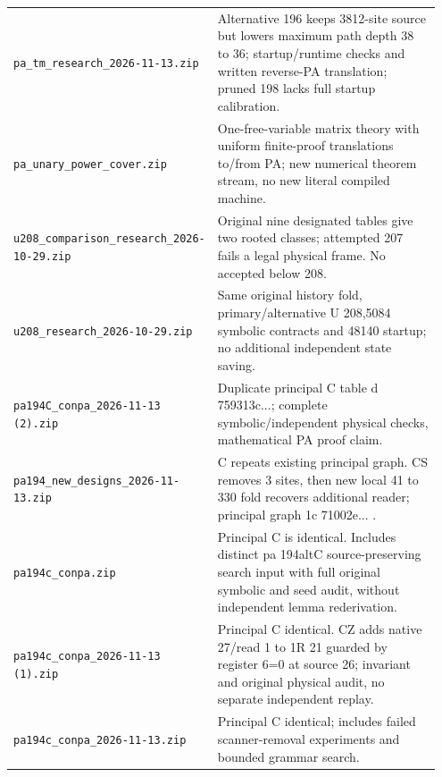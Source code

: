 \begin{longtable}{@{}p{0.38\linewidth}p{0.57\linewidth}@{}}
\nolinkurl{pa_tm_research_2026-11-13.zip} & Alternative 196 keeps 3812-site source but lowers maximum path depth 38 to 36; startup/runtime checks and written reverse-PA translation; pruned 198 lacks full startup calibration.\\[5pt]
\nolinkurl{pa_unary_power_cover.zip} & One-free-variable matrix theory with uniform finite-proof translations to/from PA; new numerical theorem stream, no new literal compiled machine.\\[5pt]
\nolinkurl{u208_comparison_research_2026-10-29.zip} & Original nine designated tables give two rooted classes; attempted 207 fails a legal physical frame. No accepted below 208.\\[5pt]
\nolinkurl{u208_research_2026-10-29.zip} & Same original history fold, primary/alternative U 208,5084 symbolic contracts and 48140 startup; no additional independent state saving.\\[5pt]
\nolinkurl{pa194C_conpa_2026-11-13 (2).zip} & Duplicate principal C table d 759313c...; complete symbolic/independent physical checks, mathematical PA proof claim.\\[5pt]
\nolinkurl{pa194_new_designs_2026-11-13.zip} & C repeats existing principal graph. CS removes 3 sites, then new local 41 to 330 fold recovers additional reader; principal graph 1c 71002e... .\\[5pt]
\nolinkurl{pa194c_conpa.zip} & Principal C is identical. Includes distinct pa 194altC source-preserving search input with full original symbolic and seed audit, without independent lemma rederivation.\\[5pt]
\nolinkurl{pa194c_conpa_2026-11-13 (1).zip} & Principal C identical. CZ adds native 27/read 1 to 1R 21 guarded by register 6=0 at source 26; invariant and original physical audit, no separate independent replay.\\[5pt]
\nolinkurl{pa194c_conpa_2026-11-13.zip} & Principal C identical; includes failed scanner-removal experiments and bounded grammar search.\\[5pt]
\end{longtable}\endgroup
